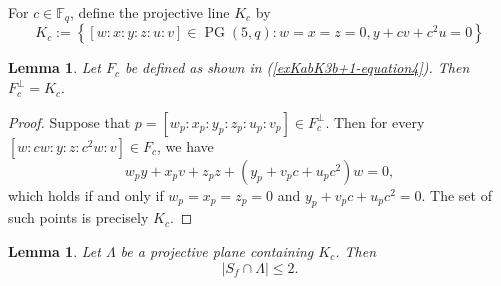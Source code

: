 \documentclass[11pt,a4paper]{article}
\newtheorem{lemma}[theorem]{Lemma}
\theoremstyle{definition}
\theoremstyle{remark}
\newcommand{\PG}{\operatorname{PG}}
\newcommand{\spanop}{\operatorname{span}}
\begin{document}
For $c \in \mathbb{F}_q$, define the projective line $K_c$ by
$$
K_c:=\left\{[w:x:y:z:u:v]\in\PG(5,q): w=x=z=0, y+cv+c^2u=0\right\}
$$

\begin{lemma} \label{lem:polar-of-Fc}
Let $F_c$ be defined as shown in (\ref{exKabK3b+1-equation4}). Then 
$
F_c^\perp = K_c.
$
\end{lemma}

\begin{proof}
Suppose that $p = [w_p:x_p: y_p: z_p: u_p: v_p]\in F_c^\perp$. Then for every $[w:cw:y:z:c^2w:v]\in F_c$, we have
\[
w_p y + x_p v + z_p z + (y_p +  v_pc +  u_pc^2) w = 0,
\]
which holds  if and only if $w_p = x_p = z_p = 0$ and $y_p +  v_pc +  u_pc^2 = 0$. The set of such points is precisely $K_c$.
\end{proof}

\begin{lemma} \label{lem:polarity-exceptional}
Let $\Lambda$ be a projective plane containing $K_c$. Then
\[
|S_f \cap \Lambda| \leq 2.
\]
\end{lemma}
\end{document}
